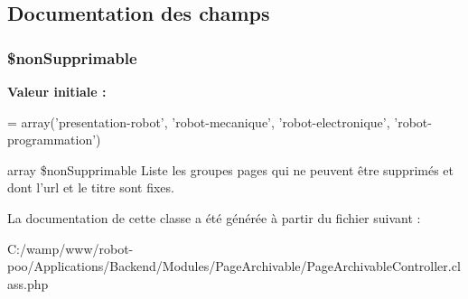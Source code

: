 \subsection{Documentation des champs}
\hypertarget{class_applications_1_1_backend_1_1_modules_1_1_page_archivable_1_1_page_archivable_controller_a25c6842b81a175d908c8994c883d5fe1}{
\subsubsection[{\$non\+Supprimable}]{\setlength{\rightskip}{0pt plus 5cm}\$non\+Supprimable\hspace{0.3cm}{\ttfamily [protected]}}}\label{class_applications_1_1_backend_1_1_modules_1_1_page_archivable_1_1_page_archivable_controller_a25c6842b81a175d908c8994c883d5fe1}
{\bfseries Valeur initiale \+:}
\begin{DoxyCode}
= array(\textcolor{stringliteral}{'presentation-robot'},
                                    \textcolor{stringliteral}{'robot-mecanique'}, 
                                    \textcolor{stringliteral}{'robot-electronique'}, 
                                    \textcolor{stringliteral}{'robot-programmation'})
\end{DoxyCode}
array \$non\+Supprimable Liste les groupes pages qui ne peuvent être supprimés et dont l'url et le titre sont fixes. 

La documentation de cette classe a été générée à partir du fichier suivant \+:\begin{DoxyCompactItemize}
\item 
C\+:/wamp/www/robot-\/poo/\+Applications/\+Backend/\+Modules/\+Page\+Archivable/Page\+Archivable\+Controller.\+class.\+php\end{DoxyCompactItemize}
